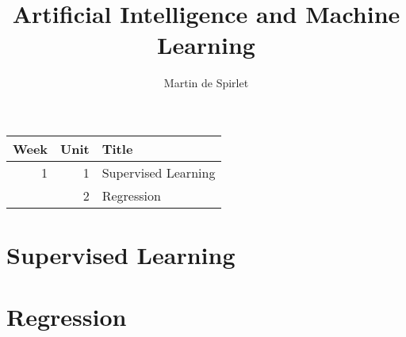 \documentclass[
  11pt,
  a4paper,
]{article}
\title{Artificial Intelligence and Machine Learning}
\author{Martin de Spirlet}
\date{}
\begin{document}

\maketitle

\vspace*{\fill}

\begin{table}[htp]
  \centering
  \begin{tabular}{rrl}
    \toprule
    Week & Unit & Title \\
    \midrule
    1 & 1 & Supervised Learning \\
      & 2 & Regression \\
    \bottomrule
  \end{tabular}
\end{table}

\vspace*{\fill}
\addvspace{1in}

\clearpage


\section{Supervised Learning}


\section{Regression}

\end{document}
